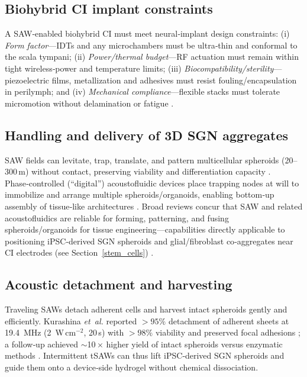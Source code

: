 \documentclass[referee,pdflatex, sn-vancouver-num]{sn-jnl}%
\theoremstyle{thmstyleone}%
\theoremstyle{thmstyletwo}%
\theoremstyle{thmstylethree}%
\begin{document}
\subsection{Biohybrid CI implant constraints}
A SAW‑enabled biohybrid CI must meet neural‑implant design constraints: (i) \textit{Form factor}—IDTs and any microchambers must be ultra‑thin and conformal to the scala tympani; (ii) \textit{Power/thermal budget}—RF actuation must remain within tight wireless‑power and temperature limits; (iii) \textit{Biocompatibility/sterility}—piezoelectric films, metallization and adhesives must resist fouling/encapsulation in perilymph; and (iv) \textit{Mechanical compliance}—flexible stacks must tolerate micromotion without delamination or fatigue \cite{Campbell1998,Ding2013,Mandal2022,Friend2011,Yeo2014_SAWmicrofluidics,Gedge2012_SAW,TrolierMcKinstry2004_PiezoMEMS,Dagdeviren2014_ConformalPiezo,Cogan2008_NeuralElectrodes,Merrill2005_Waveforms,Sewell2009,ISO14708-7:2016_CI,ISO10993-1_2018_Biocompatibility,Agostini2021_UHFSAW}.

\subsection{Handling and delivery of 3D SGN aggregates}
SAW fields can levitate, trap, translate, and pattern multicellular spheroids (20–300\,\textmu m) without contact, preserving viability and differentiation capacity \cite{rufo2022}. Phase‑controlled (``digital'') acoustofluidic devices place trapping nodes at will to immobilize and arrange multiple spheroids/organoids, enabling bottom‑up assembly of tissue‑like architectures \cite{Cai2020_Biofabrication}. Broad reviews concur that SAW and related acoustofluidics are reliable for forming, patterning, and fusing spheroids/organoids for tissue engineering—capabilities directly applicable to positioning iPSC‑derived SGN spheroids and glial/fibroblast co‑aggregates near CI electrodes (see Section~\ref{stem_cells}) \cite{Wu2022_EngRegen,Wu2024_MicroNano,Zhang2020_AcousticMicrofluidics,Gedge2012_SAW}.

\subsection{Acoustic detachment and harvesting}
Traveling SAWs detach adherent cells and harvest intact spheroids gently and efficiently. Kurashina \emph{et~al.} reported $>\!95\%$ detachment of adherent sheets at 19.4~MHz (2~W\,cm$^{-2}$, 20\,s) with $>\!98\%$ viability and preserved focal adhesions \cite{Kurashina2019}; a follow‑up achieved $\sim$10\,$\times$ higher yield of intact spheroids versus enzymatic methods \cite{kurihara2022}. Intermittent tSAWs can thus lift iPSC‑derived SGN spheroids and guide them onto a device‑side hydrogel without chemical dissociation.
\end{document}
